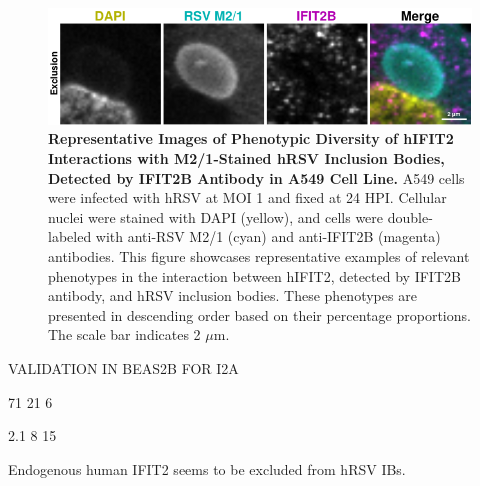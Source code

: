 \begin{figure}
    \centering
    \includegraphics[width=1\linewidth]{08. Chapter 3/Figs/02. Infection/02. IFIT2/02. IFIT2B/09. i2b a549 hrsv m21.pdf} 
    \caption[Representative Images of Phenotypic Diversity of hIFIT2 Interactions with M2/1-Stained hRSV Inclusion Bodies, Detected by IFIT2B Antibody in A549 Cell Line.]{\textbf{Representative Images of Phenotypic Diversity of hIFIT2 Interactions with M2/1-Stained hRSV Inclusion Bodies, Detected by IFIT2B Antibody in A549 Cell Line.} A549 cells were infected with hRSV at MOI 1 and fixed at 24 HPI. Cellular nuclei were stained with DAPI (yellow), and cells were double-labeled with anti-RSV M2/1 (cyan) and anti-IFIT2B (magenta) antibodies. This figure showcases representative examples of relevant phenotypes in the interaction between hIFIT2, detected by IFIT2B antibody, and hRSV inclusion bodies. These phenotypes are presented in descending order based on their percentage proportions. The scale bar indicates 2 \(\mu \mbox{m}\).}
    \label{fig:Representative Images of Phenotypic Diversity of hIFIT2 Interactions with M2/1-Stained hRSV Inclusion Bodies, Detected by IFIT2B Antibody in A549 Cell Line}
\end{figure}

VALIDATION IN BEAS2B FOR I2A

71 21 6

2.1 8 15

Endogenous human IFIT2 seems to be excluded from hRSV IBs.

